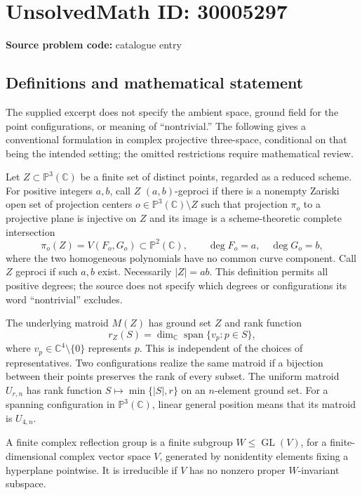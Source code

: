 \documentclass[11pt]{article}
\newcommand{\C}{\mathbb{C}}
\newcommand{\PP}{\mathbb{P}}
\begin{document}
\section*{UnsolvedMath ID: 30005297}
\textbf{Source problem code:} catalogue entry
\subsection{Definitions and mathematical statement}
The supplied excerpt does not specify the ambient space, ground field for the point configurations, or meaning of ``nontrivial.'' The following gives a conventional formulation in complex projective three-space, conditional on that being the intended setting; the omitted restrictions require mathematical review.

Let \(Z\subset\PP^3(\C)\) be a finite set of distinct points, regarded as a reduced scheme. For positive integers \(a,b\), call \(Z\) \((a,b)\)-geproci if there is a nonempty Zariski open set of projection centers \(o\in\PP^3(\C)\setminus Z\) such that projection \(\pi_o\) to a projective plane is injective on \(Z\) and its image is a scheme-theoretic complete intersection
\[
\pi_o(Z)=V(F_o,G_o)\subset\PP^2(\C),\qquad \deg F_o=a,\quad\deg G_o=b,
\]
where the two homogeneous polynomials have no common curve component. Call \(Z\) geproci if such \(a,b\) exist. Necessarily \(|Z|=ab\). This definition permits all positive degrees; the source does not specify which degrees or configurations its word ``nontrivial'' excludes.

The underlying matroid \(M(Z)\) has ground set \(Z\) and rank function
\[
r_Z(S)=\dim_{\C}\operatorname{span}\{v_p:p\in S\},
\]
where \(v_p\in\C^4\setminus\{0\}\) represents \(p\). This is independent of the choices of representatives. Two configurations realize the same matroid if a bijection between their points preserves the rank of every subset. The uniform matroid \(U_{r,n}\) has rank function \(S\mapsto\min\{|S|,r\}\) on an \(n\)-element ground set. For a spanning configuration in \(\PP^3(\C)\), linear general position means that its matroid is \(U_{4,n}\).

A finite complex reflection group is a finite subgroup \(W\leq\operatorname{GL}(V)\), for a finite-dimensional complex vector space \(V\), generated by nonidentity elements fixing a hyperplane pointwise. It is irreducible if \(V\) has no nonzero proper \(W\)-invariant subspace.
\end{document}
